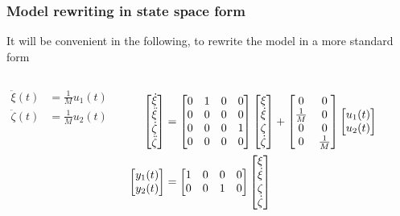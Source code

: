 \begin{frame} 
	\frametitle{Model rewriting in state space form}
	It will be convenient in the following, to rewrite the model in a more standard form
    \begin{columns}[onlytextwidth]
        \begin{align*}
        \ddot{\xi}(t)& = \frac{1}{M} u_1(t) \\
        \ddot{\zeta}(t)& = \frac{1}{M} u_2(t)
        \end{align*}
    	\begin{align*}
    	  \begin{bmatrix}\dot{\xi}\\\ddot{\xi}\\\dot{\zeta}\\\ddot{\zeta}\end{bmatrix}&=
          \begin{bmatrix}0&1&0&0\\0&0&0&0\\0&0&0&1\\0&0&0&0\end{bmatrix}\begin{bmatrix}\xi\\\dot{\xi}\\{\zeta}\\\dot{\zeta}\end{bmatrix} + \begin{bmatrix}0&0\\ \frac{1}{M} &0\\0&0 \\0&\frac{1}{M}\end{bmatrix} \begin{bmatrix}u_1(t)\\u_2(t)\end{bmatrix}\\
          \begin{bmatrix}y_1(t)\\y_2(t)\end{bmatrix}&=\begin{bmatrix}1&0&0&0\\0&0&1&0\end{bmatrix}\begin{bmatrix}\xi\\\dot{\xi}\\{\zeta}\\\dot{\zeta}\end{bmatrix}
    	\end{align*}
    \end{columns}
\end{frame}

